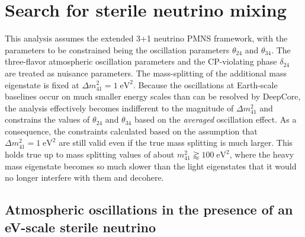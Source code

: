\chapter{Search for sterile neutrino mixing}
\setchapterpreamble[u]{\margintoc}
\label{ch:measurement-sterile}

This analysis assumes the extended 3+1 neutrino PMNS framework, with the parameters to be constrained being the oscillation parameters $\theta_{24}$ and $\theta_{34}$. The three-flavor atmospheric oscillation parameters and the CP-violating phase $\delta_{24}$ are treated as nuisance parameters. The mass-splitting of the additional mass eigenstate is fixed at $\Delta m^2_{41}=1\;\mathrm{eV^2}$. Because the oscillations at Earth-scale baselines occur on much smaller energy scales than can be resolved by DeepCore, the analysis effectively becomes indifferent to the magnitude of $\Delta m^2_{41}$ and constrains the values of $\theta_{24}$ and $\theta_{34}$ based on the \emph{averaged} oscillation effect. As a consequence, the constraints calculated based on the assumption that $\Delta m^2_{41}=1\;\mathrm{eV^2}$ are still valid even if the true mass splitting is much larger. This holds true up to mass splitting values of about $m^2_{41}\gtrapprox100\;\mathrm{eV^2}$, where the heavy mass eigenstate becomes so much slower than the light eigenstates that it would no longer interfere with them and decohere\cite{atmo_decoherence}.

\section{Atmospheric oscillations in the presence of an eV-scale sterile neutrino}

